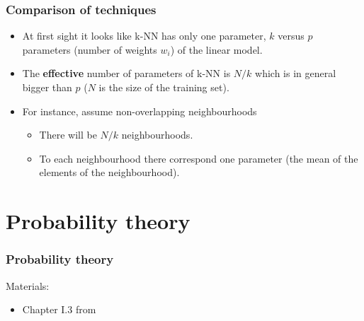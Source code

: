 \documentclass[notes]{beamer}          %
\newif\iffull
\begin{document}
\begin{frame}
\frametitle{Comparison of techniques}

    \begin{itemize}
        \item At first sight it looks like k-NN has only one parameter, $k$ versus $p$ parameters (number of weights $w_i$) of the linear model.
        \item The {\bf effective}  number of parameters of k-NN is $N/k$ which is in general bigger than $p$ ($N$ is the size of the training set).
        \item For instance, assume non-overlapping neighbourhoods
            \begin{itemize}
                \item There will be $N/k$ neighbourhoods.
                \item To each neighbourhood there correspond one parameter (the mean of the elements of the neighbourhood).
            \end{itemize}
    \end{itemize}

\end{frame}

\iffull
\begin{frame}
\frametitle{Discussion point 2}
Assume that you are building a machine learning model to be used as an \textit{aid} by clinicians for decision making. The inputs to the model are a number of \textit{biomarkers} describing the condition of the patient.
\\~\

The clinician specifies that they are interested in a model that is \textit{interpretable}, i.e. a model that will not only output a prediction but also give an indication about which biomarkers are important when making the prediction.
\\~\

You can either use a linear model or a $k$-NN classifier. What is the better choice in your opinion?

\end{frame}
\fi

\iffull %
\section{Probability theory}

\begin{frame}
\frametitle{Probability theory}

Materials:
\begin{itemize}
    \item Chapter I.3 from \cite{deeplearning}
\end{itemize}
\end{frame}
\end{document}
